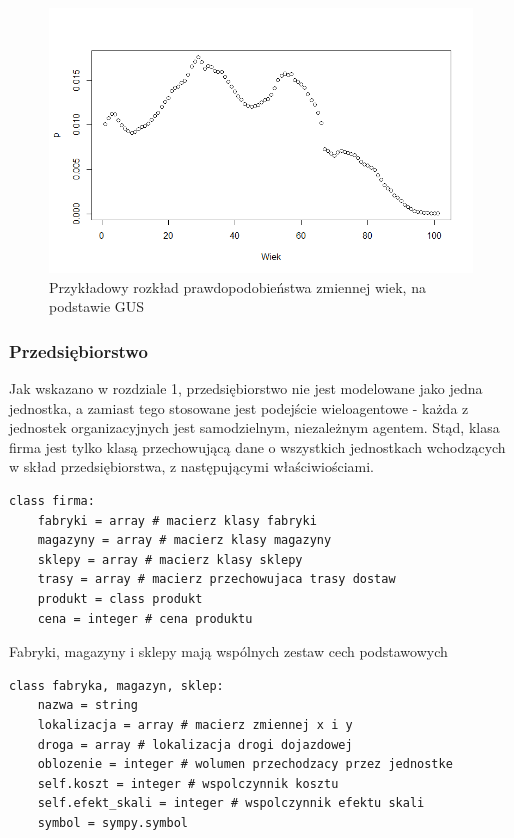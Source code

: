 \documentclass{article}
\begin{document}
\begin{figure}
  \centering
\includegraphics[width=\linewidth]{pictures/rplot01.png}
  \caption{Przykładowy rozkład prawdopodobieństwa zmiennej wiek, na podstawie GUS}
  \label{fig:wiek}
\end{figure}


\subsubsection{Przedsiębiorstwo}

Jak wskazano w rozdziale 1, przedsiębiorstwo nie jest modelowane jako jedna jednostka, a zamiast tego stosowane jest podejście wieloagentowe - każda z jednostek organizacyjnych jest samodzielnym, niezależnym agentem. Stąd, klasa firma jest tylko klasą przechowującą dane o wszystkich jednostkach wchodzących w skład przedsiębiorstwa, z następującymi właściwiościami.

\begin{lstlisting}[frame=single]  
class firma:   
	fabryki = array # macierz klasy fabryki
	magazyny = array # macierz klasy magazyny
	sklepy = array # macierz klasy sklepy
	trasy = array # macierz przechowujaca trasy dostaw
	produkt = class produkt 
	cena = integer # cena produktu
\end{lstlisting}


Fabryki, magazyny i sklepy mają wspólnych zestaw cech podstawowych 

\begin{lstlisting}[frame=single]  
class fabryka, magazyn, sklep:   
	nazwa = string
	lokalizacja = array # macierz zmiennej x i y
	droga = array # lokalizacja drogi dojazdowej
	oblozenie = integer # wolumen przechodzacy przez jednostke
	self.koszt = integer # wspolczynnik kosztu
	self.efekt_skali = integer # wspolczynnik efektu skali	
	symbol = sympy.symbol 
\end{lstlisting}
\end{document}
